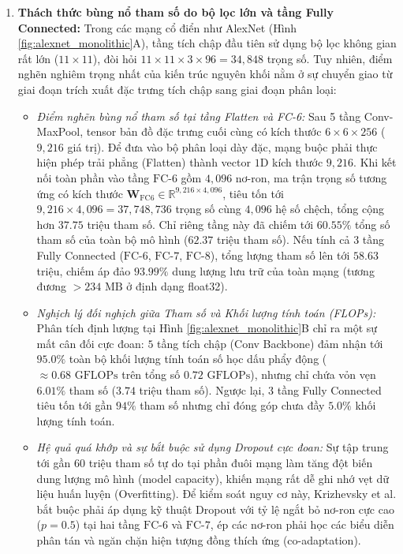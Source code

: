 \documentclass[12pt,a4paper]{report}
\begin{document}
\begin{enumerate}[leftmargin=2em]
    \item \textbf{Thách thức bùng nổ tham số do bộ lọc lớn và tầng Fully Connected:}
    Trong các mạng cổ điển như AlexNet (Hình \ref{fig:alexnet_monolithic}A), tầng tích chập đầu tiên sử dụng bộ lọc không gian rất lớn ($11 \times 11$), đòi hỏi $11 \times 11 \times 3 \times 96 = 34{,}848$ trọng số. Tuy nhiên, điểm nghẽn nghiêm trọng nhất của kiến trúc nguyên khối nằm ở sự chuyển giao từ giai đoạn trích xuất đặc trưng tích chập sang giai đoạn phân loại:
    \begin{itemize}[leftmargin=1.5em]
        \item \textit{Điểm nghẽn bùng nổ tham số tại tầng Flatten và FC-6:} Sau 5 tầng Conv-MaxPool, tensor bản đồ đặc trưng cuối cùng có kích thước $6 \times 6 \times 256$ ($9{,}216$ giá trị). Để đưa vào bộ phân loại dày đặc, mạng buộc phải thực hiện phép trải phẳng (Flatten) thành vector $1\mathrm{D}$ kích thước $9{,}216$. Khi kết nối toàn phần vào tầng $\text{FC-6}$ gồm $4{,}096$ nơ-ron, ma trận trọng số tương ứng có kích thước $\mathbf{W}_{\text{FC6}} \in \mathbb{R}^{9{,}216 \times 4{,}096}$, tiêu tốn tới $9{,}216 \times 4{,}096 = 37{,}748{,}736$ trọng số cùng $4{,}096$ hệ số chệch, tổng cộng hơn $37.75$ triệu tham số. Chỉ riêng tầng này đã chiếm tới $60.55\%$ tổng số tham số của toàn bộ mô hình ($62.37$ triệu tham số). Nếu tính cả 3 tầng Fully Connected ($\text{FC-6}$, $\text{FC-7}$, $\text{FC-8}$), tổng lượng tham số lên tới $58.63$ triệu, chiếm áp đảo $93.99\%$ dung lượng lưu trữ của toàn mạng (tương đương $>234\text{ MB}$ ở định dạng float32).
        
        \item \textit{Nghịch lý đối nghịch giữa Tham số và Khối lượng tính toán (FLOPs):} Phân tích định lượng tại Hình \ref{fig:alexnet_monolithic}B chỉ ra một sự mất cân đối cực đoan: $5$ tầng tích chập (Conv Backbone) đảm nhận tới $95.0\%$ toàn bộ khối lượng tính toán số học dấu phẩy động ($\approx 0.68\text{ GFLOPs}$ trên tổng số $0.72\text{ GFLOPs}$), nhưng chỉ chứa vỏn vẹn $6.01\%$ tham số ($3.74$ triệu tham số). Ngược lại, $3$ tầng Fully Connected tiêu tốn tới gần $94\%$ tham số nhưng chỉ đóng góp chưa đầy $5.0\%$ khối lượng tính toán.
        
        \item \textit{Hệ quả quá khớp và sự bắt buộc sử dụng Dropout cực đoan:} Sự tập trung tới gần $60$ triệu tham số tự do tại phần đuôi mạng làm tăng đột biến dung lượng mô hình (model capacity), khiến mạng rất dễ ghi nhớ vẹt dữ liệu huấn luyện (Overfitting). Để kiểm soát nguy cơ này, Krizhevsky et al. bắt buộc phải áp dụng kỹ thuật Dropout với tỷ lệ ngắt bỏ nơ-ron cực cao ($p = 0.5$) tại hai tầng $\text{FC-6}$ và $\text{FC-7}$, ép các nơ-ron phải học các biểu diễn phân tán và ngăn chặn hiện tượng đồng thích ứng (co-adaptation).
        

\end{itemize}
\end{enumerate}
\end{document}
